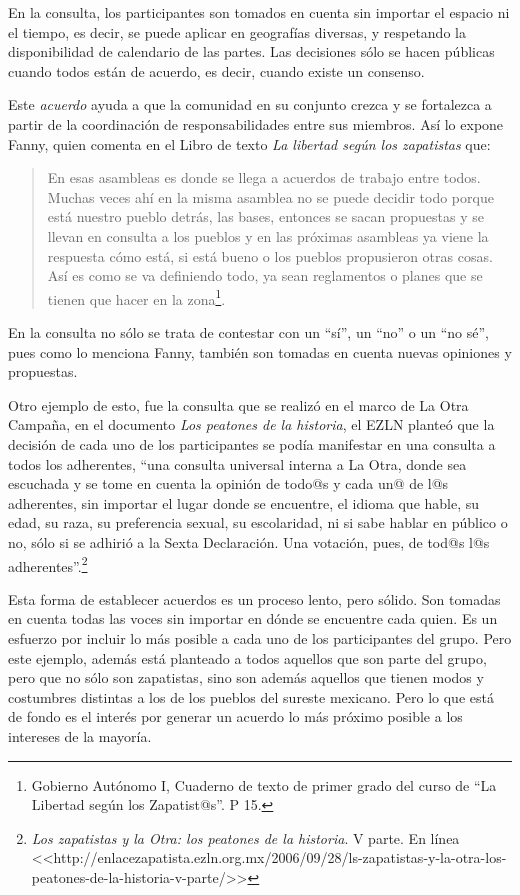 \documentclass[oneside]{book}
\begin{document}
En la consulta, los participantes son tomados en cuenta sin importar el espacio ni el tiempo, es decir, se puede aplicar en geografías diversas, y respetando la disponibilidad de calendario de las partes. Las decisiones sólo se hacen públicas cuando todos están de acuerdo, es decir, cuando existe un consenso.

Este \textit{acuerdo} ayuda a que la comunidad en su conjunto crezca y se fortalezca a partir de la coordinación de responsabilidades entre sus miembros. Así lo expone Fanny, quien comenta en el Libro de texto \textit{La libertad según los zapatistas} que:

\begin{quote}
En esas asambleas es donde se llega a acuerdos de trabajo entre todos. Muchas veces ahí en la misma asamblea no se puede decidir todo porque está nuestro pueblo detrás, las bases, entonces se sacan propuestas y se llevan en consulta a los pueblos y en las próximas asambleas ya viene la respuesta cómo está, si está bueno o los pueblos propusieron otras cosas. Así es como se va definiendo todo, ya sean reglamentos o planes que se tienen que hacer en la zona\footnote{ Gobierno Autónomo I, Cuaderno de texto de primer grado del curso de “La Libertad según los Zapatist@s”. P 15.}.
\end{quote}

En la consulta no sólo se trata de contestar con un “sí”, un “no” o un “no sé”, pues como lo menciona Fanny, también son tomadas en cuenta nuevas opiniones y propuestas. 
	
Otro ejemplo de esto, fue la consulta que se realizó en el marco de La Otra Campaña, en el documento \textit{Los peatones de la historia}, el EZLN planteó que la decisión de cada uno de los participantes se podía manifestar en una consulta a todos los adherentes, “una consulta universal interna a La Otra, donde sea escuchada y se tome en cuenta la opinión de todo@s y cada un@ de l@s adherentes, sin importar el lugar donde se encuentre, el idioma que hable, su edad, su raza, su preferencia sexual, su escolaridad, ni si sabe hablar en público o no, sólo si se adhirió a la Sexta Declaración.  Una votación, pues, de tod@s l@s adherentes''.\footnote{\textit{Los zapatistas y la Otra: los peatones de la historia}. V parte. En línea <<http://enlacezapatista.ezln.org.mx/2006/09/28/ls-zapatistas-y-la-otra-los-peatones-de-la-historia-v-parte/>>}

Esta forma de establecer acuerdos es un proceso lento, pero sólido. Son tomadas en cuenta todas las voces sin importar en dónde se encuentre cada quien. Es un esfuerzo por incluir lo más posible a cada uno de los participantes del grupo. Pero este ejemplo, además está planteado a todos aquellos que son parte del grupo, pero que no sólo son zapatistas, sino son además aquellos que tienen modos y costumbres distintas a los de los pueblos del sureste mexicano. Pero lo que está de fondo es el interés por generar un acuerdo lo más próximo posible a los intereses de la mayoría.
\end{document}
